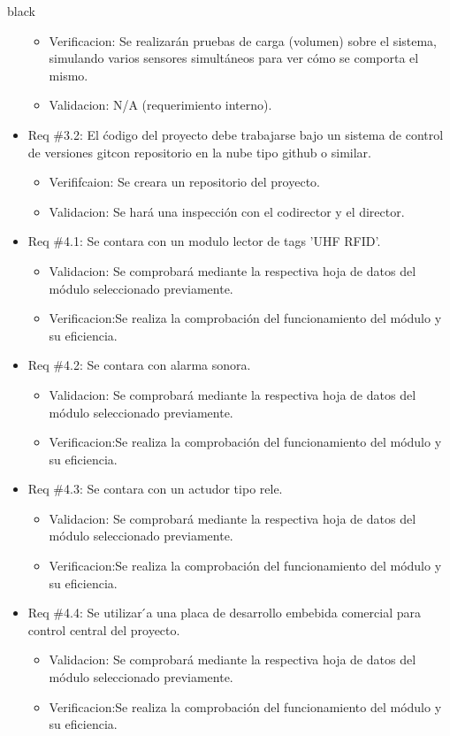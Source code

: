 \documentclass[
11pt, %
codirector, %
]{charter}
\begin{document}
\begin{consigna}{black}
\begin{itemize}
\begin{itemize}
	\item Verificacion: Se realizarán pruebas de carga (volumen) sobre el sistema, simulando varios sensores simultáneos para ver cómo se comporta el mismo.
	\item Validacion: N/A (requerimiento interno).
\end{itemize}
\item Req \#3.2:  El ćodigo del proyecto debe trabajarse bajo un sistema de control de versiones gitcon repositorio en la nube tipo github o similar.
\begin{itemize}
	\item Verififcaion: Se creara un repositorio del proyecto.
	\item Validacion: Se hará una inspección con el codirector y el director.
\end{itemize}
\item Req \#4.1:  Se contara con un modulo lector de tags ’UHF RFID’.
\begin{itemize}
	\item Validacion: Se comprobará mediante la respectiva hoja de datos del módulo seleccionado previamente.
	\item Verificacion:Se realiza la comprobación del funcionamiento del módulo y su eficiencia.
\end{itemize}
\item Req \#4.2:  Se contara con alarma sonora.
\begin{itemize}
	\item Validacion: Se comprobará mediante la respectiva hoja de datos del módulo seleccionado previamente.
	\item Verificacion:Se realiza la comprobación del funcionamiento del módulo y su eficiencia.
\end{itemize}
\item Req \#4.3:   Se contara con un actudor tipo rele.
\begin{itemize}
	\item Validacion: Se comprobará mediante la respectiva hoja de datos del módulo seleccionado previamente.
	\item Verificacion:Se realiza la comprobación del funcionamiento del módulo y su eficiencia.
\end{itemize}
\item Req \#4.4:  Se  utilizar ́a  una  placa  de  desarrollo  embebida  comercial  para  control  central  del proyecto.
\begin{itemize}
	\item Validacion: Se comprobará mediante la respectiva hoja de datos del módulo seleccionado previamente.
	\item Verificacion:Se realiza la comprobación del funcionamiento del módulo y su eficiencia.
\end{itemize}
\end{itemize}
\end{consigna}
\end{document}

